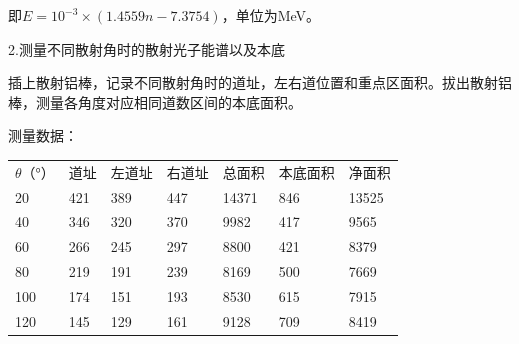 \documentclass[font=default]{mpltx}
\begin{document}
即$E = {10}^{-3} \times (1.4559n - 7.3754)$，单位为MeV。

2.测量不同散射角时的散射光子能谱以及本底

插上散射铝棒，记录不同散射角时的道址，左右道位置和重点区面积。拔出散射铝棒，测量各角度对应相同道数区间的本底面积。

测量数据：
\begin{table}[]
\begin{tabular}{llll}
$\theta$（°）         & 道址                 &左道址            &右道址          &总面积    &本底面积    &净面积 \\
20                   & 421                  &389                &447            &14371    &846        &13525 \\
40                   & 346                   &320                &370           &9982     &417        &9565 \\
60                   & 266                   &245                &297           &8800     &421        &8379  \\
80                   & 219                  &191                  &239          &8169     &500        &7669  \\
100                  & 174                  &151                 &193           &8530     &615        &7915  \\
120                  &145                   &129                 &161           &9128     &709        &8419  \\
\end{tabular}
\end{table}
\end{document}
